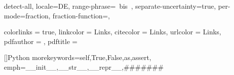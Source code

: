


\sisetup
{
	detect-all, %
	locale=DE, %
	range-phrase={\ bis\ }, %
	separate-uncertainty=true, %
		per-mode=fraction, %
		fraction-function=\sfrac,
}


\hypersetup
{
	colorlinks	= true,
	linkcolor   = Links, 
	citecolor   = Links,
	urlcolor    = Links,
	pdfauthor   = {\JHPreamble@author},
	pdftitle    = {\JHPreamble@title}%
}



    []{Python} %
{
    morekeywords={self,True,False,as,assert},           
    emph={__init__,__str__,__repr__,\#\#\#\#\#\#\#}
}

\tensorformat{}



\usepackage{amsthm}
\usepackage{thmtools}

